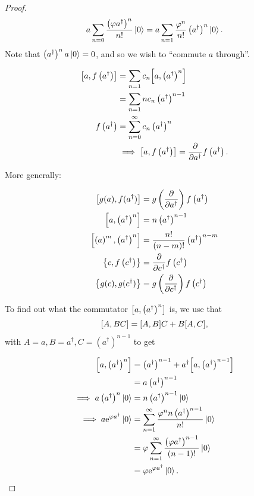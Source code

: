 \begin{proof}
\label{unc:proof}
\begin{equation*}
a\sum_{n=0}\frac{\left(\varphi a^\dagger\right)^n}{n!}\ket{0} = a\sum_{n=1} \frac{\varphi^n}{n!}\left(a^\dagger\right)^n\ket{0}.
\end{equation*}
Note that $\left(a^\dagger\right)^na\ket{0} = 0$, and so we wish to ``commute $a$ through''.

\begin{align*}
\comm{a}{f\left(a^\dagger\right)} &= \sum_{n=1}c_n\comm{a}{\left(a^\dagger\right)^n} \\
&= \sum_{n=1}nc_n\left(a^\dagger\right)^{n-1}\\
f\left(a^\dagger\right) &= \sum_{n=0}^\infty c_n\left(a^\dagger\right)^n \\
&\implies \comm{a}{f\left(a^\dagger\right)} = \pdv{a^\dagger}f\left(a^\dagger\right).
\end{align*}

More generally:

\begin{align*}
\comm{g(a)}{f(a^\dagger)} &= g\left(\pdv{a^\dagger}\right)f\left(a^\dagger\right)\\
\comm{a}{\left(a^\dagger\right)^n} &= n\left(a^\dagger\right)^{n-1} \\
\comm{\left(a\right)^m}{\left(a^\dagger\right)^n} &= \frac{n!}{(n-m)!}\left(a^\dagger\right)^{n-m} \\
\acomm{c}{f\left(c^\dagger\right)} &= \pdv{c^\dagger}f\left(c^\dagger\right) \\
\acomm{g(c)}{g(c^\dagger)} &= g\left(\pdv{c^\dagger}\right)f\left(c^\dagger\right)
\end{align*}

To find out what the commutator $\comm{a}{\left(a^\dagger\right)^n}$ is, we use that 
\begin{equation}
\comm{A}{BC} = \comm{A}{B}C + B\comm{A}{C}, 
\end{equation}
with $A =a, B = a^\dagger, C = \left(a^\dagger\right)^{n-1}$ to get

\begin{align*}
\comm{a}{\left(a^\dagger\right)^n} &= \left(a^\dagger\right)^{n-1} + a^\dagger\comm{a}{\left(a^\dagger\right)^{n-1}} \\
&= a\left(a^\dagger\right)^{n-1} \\
\implies a\left(a^\dagger\right)^{n}\ket{0} &= n\left(a^\dagger\right)^{n-1}\ket{0}\\
\implies a\e^{\varphi a^\dagger}\ket{0} &= \sum_{n=1}^\infty\frac{\varphi^nn\left(a^\dagger\right)^{n-1}}{n!}\ket{0} \\
&= \varphi\sum_{n=1}^\infty\frac{\left(\varphi a^\dagger\right)^{n-1}}{(n-1)!}\ket{0}\\ &= \varphi\e^{\varphi a^\dagger}\ket{0}.
\end{align*}
\end{proof}

